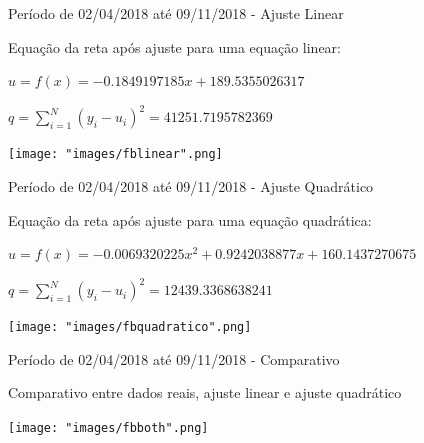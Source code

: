 \documentclass[10pt]{beamer}
\begin{document}
\begin{frame}{Período de 02/04/2018 até 09/11/2018 - Ajuste Linear}

  Equação da reta após ajuste para uma equação linear:
  \begin{center}
  $u = f(x) = -0.1849197185x + 189.5355026317$
  
 $q = \sum_{i=1}^{N} (y_{i}-u_{i})^{2} = 41251.7195782369$
  \end{center}
  
  \begin{center}
    \texttt{[image: "images/fblinear".png]}
  \end{center}
\end{frame}

\begin{frame}{Período de 02/04/2018 até 09/11/2018 - Ajuste Quadrático}

  Equação da reta após ajuste para uma equação quadrática:
  \begin{center}
  $u = f(x) = -0.0069320225x^2 + 0.9242038877x + 160.1437270675$
  
 $q = \sum_{i=1}^{N} (y_{i}-u_{i})^{2} = 12439.3368638241$
  \end{center}
  
  \begin{center}
    \texttt{[image: "images/fbquadratico".png]}
  \end{center}
\end{frame}


\begin{frame}{Período de 02/04/2018 até 09/11/2018 - Comparativo}

  Comparativo entre dados reais, ajuste linear e ajuste quadrático
  
  \begin{center}
    \texttt{[image: "images/fbboth".png]}
  \end{center}
\end{frame}
\end{document}
